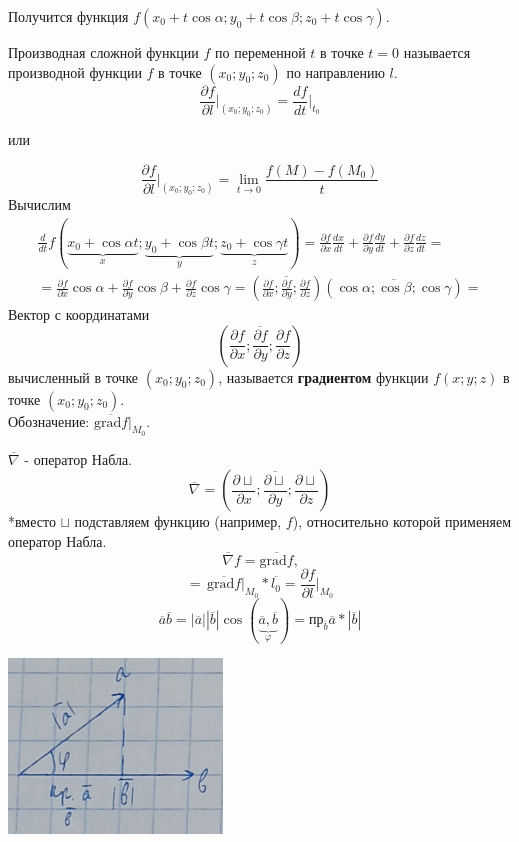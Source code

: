 \documentclass[12pt]{article}
\begin{document}
    Получится функция $f(x_0 + t\cos \alpha; y_0 + t \cos \beta; z_0 + t \cos \gamma)$.\par\noindent
    Производная сложной функции $f$ по переменной $t$ в точке $t = 0$ называется производной функции $f$ в точке $(x_0; y_0; z_0)$ по направлению $l$.
    \[ \frac{\partial f}{\partial l} \Big|_{(x_0; y_0; z_0)} = \frac{df}{dt}\Big|_{t_0} \]
    \begin{center}
        или
        \end{center}
    \[ \frac{\partial f}{\partial l} \Big|_{(x_0; y_0; z_0)} = \lim_{t \to 0}\frac{f(M) - f(M_0)}{t} \]
    Вычислим
    \begin{gather*}
        \frac{d}{dt}f(\underbrace{x_0 + \cos \alpha t}_x; \underbrace{y_0 + \cos \beta t}_y; \underbrace{z_0 + \cos \gamma t}_z) = \frac{\partial f}{\partial x} \frac{dx}{dt} + \frac{\partial f}{\partial y} \frac{dy}{dt} + \frac{\partial f}{\partial z} \frac{dz}{dt} =\\
        = \frac{\partial f}{\partial x} \cos \alpha + \frac{\partial f}{\partial y} \cos \beta + \frac{\partial f}{\partial z} \cos \gamma = \left( \overline{\frac{\partial f}{\partial x}; \frac{\partial f}{\partial y}; \frac{\partial f}{\partial z}} \right)\left( \overline{\cos \alpha; \cos \beta; \cos \gamma} \right) \boxed{=}
    \end{gather*}
    Вектор с координатами 
    \[ \left( \overline{\frac{\partial f}{\partial x}; \frac{\partial f}{\partial y}; \frac{\partial f}{\partial z}} \right) \]
    вычисленный в точке $(x_0; y_0; z_0)$, называется \textbf{градиентом} функции $f(x; y; z)$ в точке $(x_0; y_0; z_0)$.\\
    Обозначение: $\overline{\text{grad}f} \Big|_{M_0}$.\par\noindent
    $\overline{\nabla}$ - оператор Набла.
    \[ \overline{\nabla} = \left( \overline{ \frac{\partial \sqcup}{\partial x}; \frac{\partial \sqcup}{\partial y}; \frac{\partial \sqcup}{\partial z} } \right) \]
    *вместо $\sqcup$ подставляем функцию (например, $f$), относительно которой применяем оператор Набла.
    \[ \overline{\nabla} f = \overline{\text{grad}f}\text{,} \]
    \[ \boxed{=} \, \boxed{ \overline{\text{grad}f}\Big|_{M_0} * \overline{l_0} = \frac{\partial f}{\partial l}\Big|_{M_0} } \]
    \[ \overline{a}\overline{b} = |\overline{a}||\overline{b}|\cos(\underbrace{\overline{a}, \overline{b}}_{\varphi}) = \text{пр}_{\overline{b}} \overline{a} * |\overline{b}| \]
    \begin{center}
        \includegraphics{7.10.2.png}
    \end{center}
\end{document}
